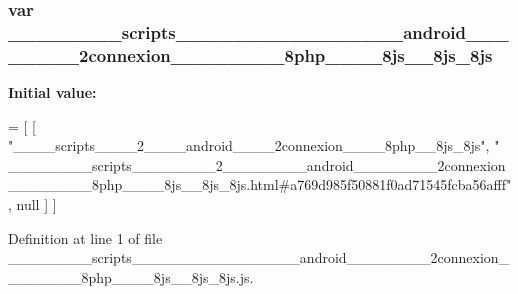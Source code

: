 \subsubsection[{\+\_\+\+\_\+\+\_\+\+\_\+\+\_\+\+\_\+\+\_\+\+\_\+scripts\+\_\+\+\_\+\+\_\+\+\_\+\+\_\+\+\_\+\+\_\+\+\_\+2\+\_\+\+\_\+\+\_\+\+\_\+\+\_\+\+\_\+\+\_\+\+\_\+android\+\_\+\+\_\+\+\_\+\+\_\+\+\_\+\+\_\+\+\_\+\+\_\+2connexion\+\_\+\+\_\+\+\_\+\+\_\+\+\_\+\+\_\+\+\_\+\+\_\+8php\+\_\+\+\_\+\+\_\+\+\_\+8js\+\_\+\+\_\+8js\+\_\+8js}]{\setlength{\rightskip}{0pt plus 5cm}var \+\_\+\+\_\+\+\_\+\+\_\+\+\_\+\+\_\+\+\_\+\+\_\+scripts\+\_\+\+\_\+\+\_\+\+\_\+\+\_\+\+\_\+\+\_\+\+\_\+\_\+\+\_\+\+\_\+\+\_\+\+\_\+\+\_\+\+\_\+\+\_\+android\+\_\+\+\_\+\+\_\+\+\_\+\+\_\+\+\_\+\+\_\+\+\_\+2connexion\+\_\+\+\_\+\+\_\+\+\_\+\+\_\+\+\_\+\+\_\+\+\_\+8php\+\_\+\+\_\+\+\_\+\+\_\+8js\+\_\+\+\_\+8js\+\_\+8js}\label{________________scripts________________2________________android________________2connexion_______d3abcca8be4418b8e87b7652b5344a03_a160ec850b4e04ac0831d8a3beefac47e}
{\bfseries Initial value\+:}
\begin{DoxyCode}
=
[
    [ \textcolor{stringliteral}{"\_\_\_\_scripts\_\_\_\_2\_\_\_\_android\_\_\_\_2connexion\_\_\_\_8php\_\_8js\_8js"}, \textcolor{stringliteral}{"
      \_\_\_\_\_\_\_\_scripts\_\_\_\_\_\_\_\_2\_\_\_\_\_\_\_\_android\_\_\_\_\_\_\_\_2connexion\_\_\_\_\_\_\_\_8php\_\_\_\_8js\_\_8js\_8js.html#a769d985f50881f0ad71545fcba56afff"}, null ]
]
\end{DoxyCode}


Definition at line 1 of file \+\_\+\+\_\+\+\_\+\+\_\+\+\_\+\+\_\+\+\_\+\+\_\+scripts\+\_\+\+\_\+\+\_\+\+\_\+\+\_\+\+\_\+\+\_\+\+\_\+\_\+\+\_\+\+\_\+\+\_\+\+\_\+\+\_\+\+\_\+\+\_\+android\+\_\+\+\_\+\+\_\+\+\_\+\+\_\+\+\_\+\+\_\+\+\_\+2connexion\+\_\+\+\_\+\+\_\+\+\_\+\+\_\+\+\_\+\+\_\+\+\_\+8php\+\_\+\+\_\+\+\_\+\+\_\+8js\+\_\+\+\_\+8js\+\_\+8js.\+js.


